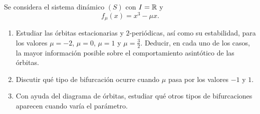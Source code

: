 \documentclass[11pt]{report}
\begin{document}
\begin{exercise}
    Se considera el sistema dinámico $(S)$ con $I = \mathbb R$ y
    \[f_\mu (x) = x^3-\mu x.\]
    \begin{enumerate}
        \item Estudiar las órbitas estacionarias y $2$-periódicas, así como su estabilidad, para los valores $\mu = -2$, $\mu = 0$, $\mu = 1$ y $\mu = \frac{3}{2}$. Deducir, en cada uno de los casos, la mayor información posible sobre el comportamiento asintótico de las órbitas.
        \item Discutir qué tipo de bifurcación ocurre cuando $\mu$ pasa por los valores $-1$ y $1$.
        \item Con ayuda del diagrama de órbitas, estudiar qué otros tipos de bifurcaciones aparecen cuando varía el parámetro.
    \end{enumerate}
\end{exercise}
\end{document}
